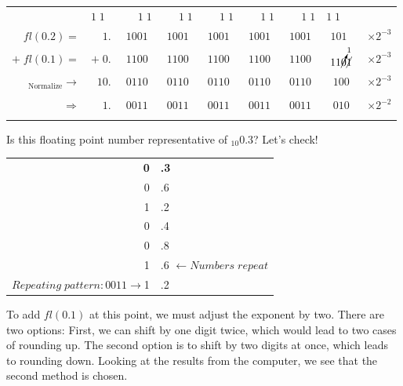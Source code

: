 \documentclass[a4paper,12pt,]{report}
\begin{document}
\begin{center}
	\begin{tabular}{rrccccccr}
		&\tiny{$1\;1\;\;$} & \tiny{$\quad\, \;1\;1$} & \tiny{$\quad\, \;1\;1$}
			& \tiny{$\quad\, \;1\;1$} & \tiny{$\quad\, \;1\;1$} & \tiny{$\quad\, \;1\;1$}
			& \tiny{$1\;1\quad \;\,$} & \\
		$fl(0.2)=$ & $1.$ & $\!1001$ & $1001$ & $1001$ & $1001$ & $1001$ & $101\;\,$ 
			& $\times2^{-3}$\\
		$+\;fl(0.1)=$ & $+\;0.$ & $\!1100$ & $1100$ & $1100$ & $1100$ & $1100$ 
			& $11\cancelto{1}{0}\cancel{1}$ & $\times2^{-3}$\\
		\hline
		$_{\text{Normalize}}\rightarrow$& $10.$ & $\!0110$ & $0110$ & $0110$ & $0110$ 
			& $0110$ & $100$ & $\times2^{-3}$\\ \\

		$\Rightarrow$ & $1.$ & $\!0011$ & $0011$ & $0011$ & $0011$ & $0011$ & $010$ 
			& $\times2^{-2}$\\ \\
	\end{tabular}
\end{center}

	Is this floating point number representative of $_{10}0.3$? Let's check!

\begin{center}
	\begin{tabular}{r|l}
	\textbf{0} & \textbf{.3}\\
	0 &.6\\
	1 &.2\\
	0 &.4\\
	0 &.8\\
	1 &.6 $\leftarrow Numbers\; repeat$\\
	$Repeating\; pattern: 0011\! \rightarrow$1 &.2 \\
	\end{tabular}
\end{center}

	To add $fl(0.1)$ at this point, we must adjust the exponent by two.  There are two options: First, we can shift 
	by one digit twice, which would lead to two 	cases of rounding up. The second option is to shift by two digits at 
	once, which leads to rounding down.  Looking at the results from the computer, we see that the second method 
	is chosen.
\end{document}
